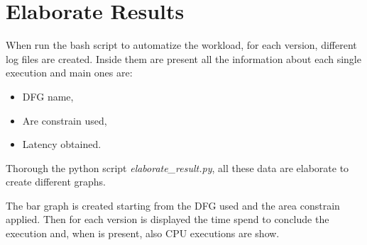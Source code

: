 \chapter{Elaborate Results}
\label{appendix2}

When run the bash script to automatize the workload, for each version, different log files
are created. Inside them are present all the information about each single execution and main ones are:

\begin{itemize}
    \item DFG name,
    \item Are constrain used,
    \item Latency obtained.
\end{itemize}

Thorough the python script \emph{elaborate\_result.py}, all these data are elaborate to create different graphs.

The bar graph is created starting from the DFG used and the area constrain applied. Then for each version is displayed the time 
spend to conclude the execution and, when is present, also CPU executions are show. 
